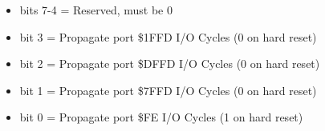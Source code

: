 \begin{itemize}
\item bits 7-4 = Reserved, must be 0
\item bit 3 = Propagate port \$1FFD I/O Cycles (0 on hard reset)
\item bit 2 = Propagate port \$DFFD I/O Cycles (0 on hard reset)
\item bit 1 = Propagate port \$7FFD I/O Cycles (0 on hard reset)
\item bit 0 = Propagate port \$FE I/O Cycles (1 on hard reset)
\end{itemize}

